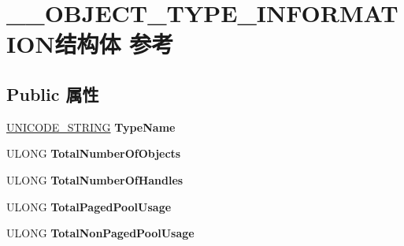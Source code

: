 \hypertarget{struct_____o_b_j_e_c_t___t_y_p_e___i_n_f_o_r_m_a_t_i_o_n}{}\section{\+\_\+\+\_\+\+O\+B\+J\+E\+C\+T\+\_\+\+T\+Y\+P\+E\+\_\+\+I\+N\+F\+O\+R\+M\+A\+T\+I\+O\+N结构体 参考}
\label{struct_____o_b_j_e_c_t___t_y_p_e___i_n_f_o_r_m_a_t_i_o_n}
\subsection*{Public 属性}
\begin{DoxyCompactItemize}
\item 
\mbox{\label{struct_____o_b_j_e_c_t___t_y_p_e___i_n_f_o_r_m_a_t_i_o_n_a134548fb288ee945cbf5234e5acc515e}} 
\hyperlink{struct___u_n_i_c_o_d_e___s_t_r_i_n_g}{U\+N\+I\+C\+O\+D\+E\+\_\+\+S\+T\+R\+I\+NG} {\bfseries Type\+Name}
\item 
\mbox{\label{struct_____o_b_j_e_c_t___t_y_p_e___i_n_f_o_r_m_a_t_i_o_n_a8be9a7c2002365f80019c64920c258bf}} 
U\+L\+O\+NG {\bfseries Total\+Number\+Of\+Objects}
\item 
\mbox{\label{struct_____o_b_j_e_c_t___t_y_p_e___i_n_f_o_r_m_a_t_i_o_n_a073a6e6effb2c345d201db34fcbbb228}} 
U\+L\+O\+NG {\bfseries Total\+Number\+Of\+Handles}
\item 
\mbox{\label{struct_____o_b_j_e_c_t___t_y_p_e___i_n_f_o_r_m_a_t_i_o_n_a29412a9dac4b6a6df0964bfbbb2c7577}} 
U\+L\+O\+NG {\bfseries Total\+Paged\+Pool\+Usage}
\item 
\mbox{\label{struct_____o_b_j_e_c_t___t_y_p_e___i_n_f_o_r_m_a_t_i_o_n_a09a42ae036b7a441c8f2ea170897203c}} 
U\+L\+O\+NG {\bfseries Total\+Non\+Paged\+Pool\+Usage}
\item 
\mbox{\label{struct_____o_b_j_e_c_t___t_y_p_e___i_n_f_o_r_m_a_t_i_o_n_afabeed8b04287f68cb722fade0a03ca9}} 

\end{DoxyCompactItemize}
